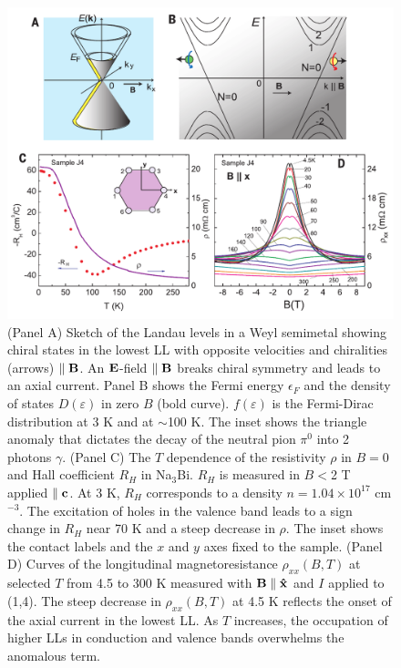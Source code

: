\begin{figure}[!htbp]
  \begin{center}
\includegraphics[width=1\linewidth]{ch-na3bi/figures/FigWeylRhoHall.pdf}
\caption{\label{figWeyl} 
(Panel A) Sketch of the Landau levels in a Weyl semimetal showing chiral states in the lowest LL with opposite velocities and chiralities (arrows)
$\parallel\bf B$. An $\bf E$-field $\parallel \bf B$ breaks chiral symmetry and leads to an axial current. 
Panel B shows the Fermi energy $\epsilon_F$ and the density of states $D(\varepsilon)$ in zero $B$ (bold curve). 
$f(\varepsilon)$ is the Fermi-Dirac distribution at 3 K and at $\sim$100 K. The inset shows the triangle anomaly that dictates the decay of the neutral pion $\pi^0$ into 2 photons $\gamma$. 
(Panel C) The $T$ dependence of the resistivity $\rho$ in $B=0$ and Hall coefficient $R_H$ in Na$_3$Bi.
$R_H$ is measured in $B<$2 T applied $\parallel \bf c$. At 3 K, $R_H$ corresponds to a density $n = 1.04\times 10^{17}$ cm$^{-3}$.  
The excitation of holes in the valence band leads to a sign change in $R_H$ near 70 K and a steep decrease in $\rho$. The inset shows the contact labels and the $x$ and $y$ axes fixed to the sample. 
(Panel D) Curves of the longitudinal magnetoresistance $\rho_{xx}(B,T)$ at selected $T$ from 4.5 to 300 K measured with $\bf B\parallel \hat{x}$ and $I$ applied to (1,4). The steep decrease in $\rho_{xx}(B,T)$ at 4.5 K reflects the onset of the axial current in the lowest LL. As $T$ increases, the occupation of higher LLs in conduction and valence bands overwhelms the anomalous term.
}
  \end{center}
\end{figure}

